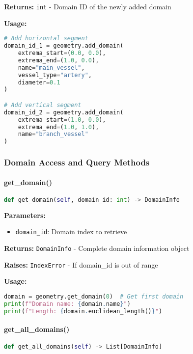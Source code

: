 \textbf{Returns:} \texttt{int} - Domain ID of the newly added domain

\textbf{Usage:}
\begin{lstlisting}[language=Python, caption=Adding Domains Example]
# Add horizontal segment
domain_id_1 = geometry.add_domain(
    extrema_start=(0.0, 0.0),
    extrema_end=(1.0, 0.0),
    name="main_vessel",
    vessel_type="artery",
    diameter=0.1
)

# Add vertical segment
domain_id_2 = geometry.add_domain(
    extrema_start=(1.0, 0.0),
    extrema_end=(1.0, 1.0),
    name="branch_vessel"
)
\end{lstlisting}

\subsubsection{Domain Access and Query Methods}

\paragraph{get\_domain()}
\begin{lstlisting}[language=Python, caption=Get Domain Method]
def get_domain(self, domain_id: int) -> DomainInfo
\end{lstlisting}

\textbf{Parameters:}
\begin{itemize}
    \item \texttt{domain\_id}: Domain index to retrieve
\end{itemize}

\textbf{Returns:} \texttt{DomainInfo} - Complete domain information object

\textbf{Raises:} \texttt{IndexError} - If domain\_id is out of range

\textbf{Usage:}
\begin{lstlisting}[language=Python]
domain = geometry.get_domain(0)  # Get first domain
print(f"Domain name: {domain.name}")
print(f"Length: {domain.euclidean_length()}")
\end{lstlisting}

\paragraph{get\_all\_domains()}
\begin{lstlisting}[language=Python, caption=Get All Domains Method]
def get_all_domains(self) -> List[DomainInfo]
\end{lstlisting}

